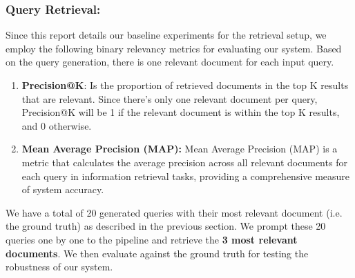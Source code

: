 \documentclass[sigconf,natbib=true,anonymous=false]{acmart}
\begin{document}
\subsubsection{\textbf{Query Retrieval:}}
\newline
Since this report details our baseline experiments for the retrieval setup, we employ the following binary relevancy metrics for evaluating our system. Based on the query generation, there is one relevant document for each input query. 
\begin{enumerate}
    \item \textbf{Precision@K}: Is the proportion of retrieved documents in the top K results that are relevant. Since there's only one relevant document per query, Precision@K will be 1 if the relevant document is within the top K results, and 0 otherwise.
    \item \textbf{Mean Average Precision (MAP):} Mean Average Precision (MAP) is a metric that calculates the average precision across all relevant documents for each query in information retrieval tasks, providing a comprehensive measure of system accuracy.
\end{enumerate}

We have a total of 20 generated queries with their most relevant document (i.e. the ground truth) as described in the previous section. We prompt these 20 queries one by one to the pipeline and retrieve the \textbf{3 most relevant documents}. We then evaluate against the ground truth for testing the robustness of our system. 
\end{document}

